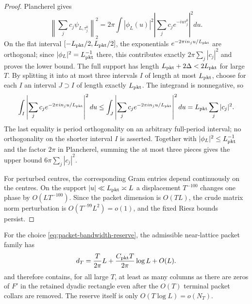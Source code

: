 \begin{proof}
Plancherel gives
\[
\left\|\sum_jc_j\psi_{L,\tau_j^0}\right\|_2^2
=2\pi\int |\phi_L(u)|^2
\left|\sum_jc_je^{-iu\tau_j^0}\right|^2du.
\]
On the flat interval $[-L_{\rm pkt}/2,L_{\rm pkt}/2]$, the exponentials
$e^{-2\pi i n_ju/L_{\rm pkt}}$ are orthogonal; since
$|\phi_L|^2=L_{\rm pkt}^{-1}$ there, this contributes exactly
$2\pi\sum_j|c_j|^2$ and proves the lower bound. The full support has length
$L_{\rm pkt}+2\Delta<2L_{\rm pkt}$ for large $T$. By splitting it into at most
three intervals $I$ of length at most $L_{\rm pkt}$, choose for each $I$ an
interval $J\supset I$ of length exactly $L_{\rm pkt}$.  The integrand is
nonnegative, so
\[
\int_I\left|\sum_jc_je^{-2\pi i n_ju/L_{\rm pkt}}\right|^2du
\le
\int_J\left|\sum_jc_je^{-2\pi i n_ju/L_{\rm pkt}}\right|^2du
=L_{\rm pkt}\sum_j|c_j|^2.
\]
The last equality is period orthogonality on an arbitrary full-period interval;
no orthogonality on the shorter interval $I$ is asserted.  Together with
$|\phi_L|^2\le L_{\rm pkt}^{-1}$ and the factor $2\pi$ in Plancherel, summing
the at most three pieces gives the upper bound
$6\pi\sum_j|c_j|^2$.

For perturbed centres, the corresponding Gram entries depend continuously on
the centres. On the support $|u|\ll L_{\rm pkt}\asymp L$ a displacement
$T^{-100}$ changes one phase by $O(LT^{-100})$. Since the packet dimension is
$O(TL)$, the crude matrix norm perturbation is $O(T^{-99}L^2)=o(1)$, and the
fixed Riesz bounds persist. \end{proof}

\begin{lemma}
\label{lem:packet-dimension}
For the choice \eqref{eq:packet-bandwidth-reserve}, the admissible near-lattice
packet family has
\begin{equation}
d_T=\frac{T}{2\pi}L+\frac{C_{\rm pkt}T}{2\pi}\log L+O(L).
\label{eq:packet-dimension-reserve}
\end{equation}
and therefore contains, for all large $T$, at least as many columns as there are
zeros of $F'$ in the retained dyadic rectangle even after the $O(T)$ terminal
packet collars are removed. The reserve itself is only
$O(T\log L)=o(N_T)$.
\end{lemma}

